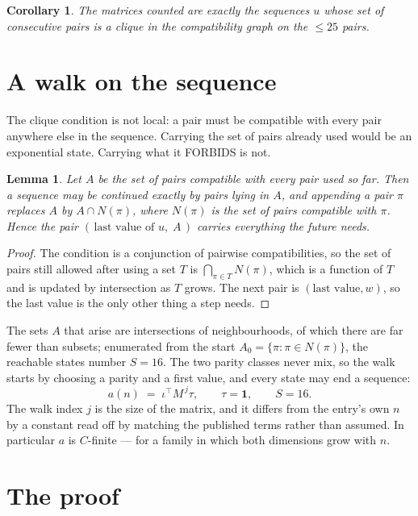 \documentclass[11pt,a4paper]{article}
\theoremstyle{plain}
\newtheorem{lemma}[theorem]{Lemma}
\newtheorem{corollary}[theorem]{Corollary}
\theoremstyle{definition}
\begin{document}
\begin{corollary}
The matrices counted are exactly the sequences $u$ whose set of consecutive pairs is a clique in
the compatibility graph on the $\le 25$ pairs.
\end{corollary}

\section{A walk on the sequence}

The clique condition is not local: a pair must be compatible with every pair anywhere else in
the sequence. Carrying the set of pairs already used would be an exponential state. Carrying
what it FORBIDS is not.

\begin{lemma}\label{lem:lump}
Let $A$ be the set of pairs compatible with every pair used so far. Then a sequence may be
continued exactly by pairs lying in $A$, and appending a pair $\pi$ replaces $A$ by
$A\cap N(\pi)$, where $N(\pi)$ is the set of pairs compatible with $\pi$. Hence the pair
$(\,\text{last value of }u,\;A\,)$ carries everything the future needs.
\end{lemma}

\begin{proof}
The condition is a conjunction of pairwise compatibilities, so the set of pairs still allowed
after using a set $T$ is $\bigcap_{\pi\in T}N(\pi)$, which is a function of $T$ and is updated
by intersection as $T$ grows. The next pair is $(\text{last value},w)$, so the last value is
the only other thing a step needs.
\end{proof}

The sets $A$ that arise are intersections of neighbourhoods, of which there are far fewer than
subsets; enumerated from the start $A_0=\{\pi:\pi\in N(\pi)\}$, the reachable states number
$S=16$. The two parity classes never mix, so the walk starts by choosing a parity and a first
value, and every state may end a sequence:
\[
a(n)\;=\;\iota^{\!\top}M^{\,j}\tau ,\qquad \tau=\mathbf{1},\qquad S=16.
\]
The walk index $j$ is the size of the matrix, and it differs from the entry's own $n$ by a
constant read off by matching the published terms rather than assumed. In particular $a$ is
$C$-finite --- for a family in which both dimensions grow with $n$.

\section{The proof}
\end{document}
